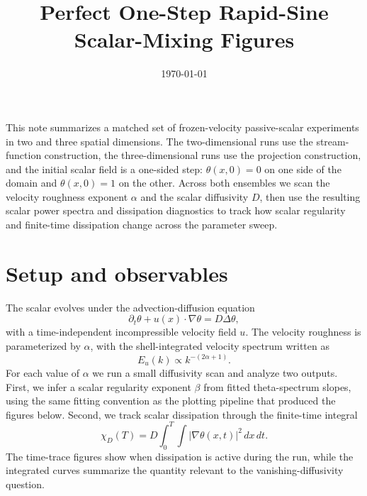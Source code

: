 \documentclass[11pt]{article}
\title{Perfect One-Step Rapid-Sine Scalar-Mixing Figures}
\author{}
\date{\today}
\begin{document}
\maketitle

\noindent
This note summarizes a matched set of frozen-velocity passive-scalar experiments in
two and three spatial dimensions. The two-dimensional runs use the stream-function
construction, the three-dimensional runs use the projection construction, and the
initial scalar field is a one-sided step: $\theta(x,0)=0$ on one side of the domain
and $\theta(x,0)=1$ on the other. Across both ensembles we scan the velocity
roughness exponent $\alpha$ and the scalar diffusivity $D$, then use the resulting
scalar power spectra and dissipation diagnostics to track how scalar regularity and
finite-time dissipation change across the parameter sweep.

\section{Setup and observables}
The scalar evolves under the advection-diffusion equation
\begin{equation}
  \partial_t \theta + u(x)\cdot \nabla \theta = D \Delta \theta,
\end{equation}
with a time-independent incompressible velocity field $u$. The velocity roughness is
parameterized by $\alpha$, with the shell-integrated velocity spectrum written as
\begin{equation}
  E_u(k) \propto k^{-(2\alpha+1)}.
\end{equation}
For each value of $\alpha$ we run a small diffusivity scan and analyze two outputs.
First, we infer a scalar regularity exponent $\beta$ from fitted theta-spectrum
slopes, using the same fitting convention as the plotting pipeline that produced the
figures below. Second, we track scalar dissipation through the finite-time integral
\begin{equation}
  \chi_D(T) = D \int_0^T \int |\nabla \theta(x,t)|^2 \, dx \, dt.
\end{equation}
The time-trace figures show when dissipation is active during the run, while the
integrated curves summarize the quantity relevant to the vanishing-diffusivity
question.
\end{document}
